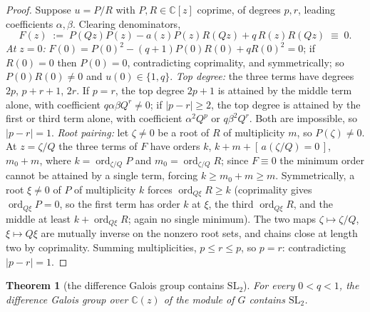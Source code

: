 \documentclass[11pt]{article}
\theoremstyle{plain}
\newtheorem{theorem}{Theorem}
\theoremstyle{definition}
\theoremstyle{remark}
\newcommand{\C}{\mathbb{C}}
\begin{document}
\begin{proof}
Suppose $u=P/R$ with $P,R\in\C[z]$ coprime, of degrees $p,r$, leading coefficients $\alpha,\beta$.
Clearing denominators,
\[
   F(z)\;:=\;P(Qz)P(z)-a(z)P(z)R(Qz)+q\,R(z)R(Qz)\;\equiv\;0 .
\]
\emph{At $z=0$:} $F(0)=P(0)^2-(q+1)P(0)R(0)+qR(0)^2=0$; if $R(0)=0$ then $P(0)=0$, contradicting
coprimality, and symmetrically; so $P(0)R(0)\ne0$ and $u(0)\in\{1,q\}$.
\emph{Top degree:} the three terms have degrees $2p$, $p+r+1$, $2r$. If $p=r$, the top degree
$2p+1$ is attained by the middle term alone, with coefficient $q\alpha\beta Q^{r}\ne0$;
if $|p-r|\ge2$, the top degree is attained by the first or third term alone, with coefficient
$\alpha^2Q^{p}$ or $q\beta^2Q^{r}$. Both are impossible, so $|p-r|=1$.
\emph{Root pairing:} let $\zeta\ne0$ be a root of $R$ of multiplicity $m$, so $P(\zeta)\ne0$. At
$z=\zeta/Q$ the three terms of $F$ have orders $k$, $k+m+[\,a(\zeta/Q)=0\,]$, $m_0+m$, where
$k=\operatorname{ord}_{\zeta/Q}P$ and $m_0=\operatorname{ord}_{\zeta/Q}R$; since $F\equiv0$ the
minimum order cannot be attained by a single term, forcing $k\ge m_0+m\ge m$. Symmetrically, a root
$\xi\ne0$ of $P$ of multiplicity $k$ forces $\operatorname{ord}_{Q\xi}R\ge k$ (coprimality gives
$\operatorname{ord}_{Q\xi}P=0$, so the first term has order $k$ at $\xi$, the third
$\operatorname{ord}_{Q\xi}R$, and the middle at least $k+\operatorname{ord}_{Q\xi}R$; again no
single minimum). The two maps $\zeta\mapsto\zeta/Q$, $\xi\mapsto Q\xi$ are mutually inverse on the
nonzero root sets, and chains close at length two by coprimality. Summing multiplicities,
$p\le r\le p$, so $p=r$: contradicting $|p-r|=1$.
\end{proof}

\begin{theorem}[the difference Galois group contains $\mathrm{SL}_2$]
\label{thm:sl2}
For every $0<q<1$, the difference Galois group over $\C(z)$ of the module of $G$ contains
$\mathrm{SL}_2$.
\end{theorem}
\end{document}
